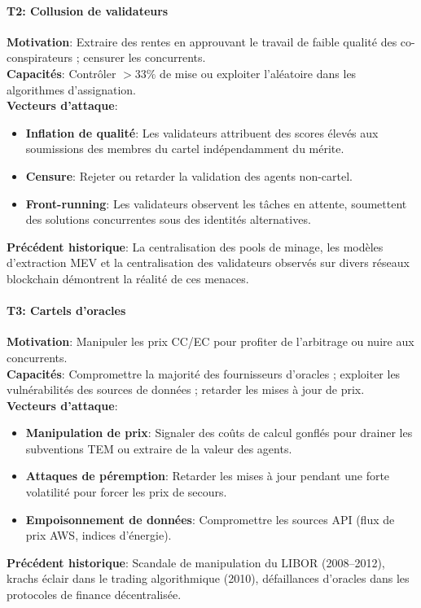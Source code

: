 \documentclass[11pt]{article}
\begin{document}
\paragraph{T2: Collusion de validateurs}
\textbf{Motivation}: Extraire des rentes en approuvant le travail de faible qualité des co-conspirateurs ; censurer les concurrents.\\
\textbf{Capacités}: Contrôler $>33\%$ de mise ou exploiter l'aléatoire dans les algorithmes d'assignation.\\
\textbf{Vecteurs d'attaque}:
\begin{itemize}[noitemsep]
  \item \textbf{Inflation de qualité}: Les validateurs attribuent des scores élevés aux soumissions des membres du cartel indépendamment du mérite.
  \item \textbf{Censure}: Rejeter ou retarder la validation des agents non-cartel.
  \item \textbf{Front-running}: Les validateurs observent les tâches en attente, soumettent des solutions concurrentes sous des identités alternatives.
\end{itemize}
\textbf{Précédent historique}: La centralisation des pools de minage, les modèles d'extraction MEV et la centralisation des validateurs observés sur divers réseaux blockchain démontrent la réalité de ces menaces.

\paragraph{T3: Cartels d'oracles}
\textbf{Motivation}: Manipuler les prix CC/EC pour profiter de l'arbitrage ou nuire aux concurrents.\\
\textbf{Capacités}: Compromettre la majorité des fournisseurs d'oracles ; exploiter les vulnérabilités des sources de données ; retarder les mises à jour de prix.\\
\textbf{Vecteurs d'attaque}:
\begin{itemize}[noitemsep]
  \item \textbf{Manipulation de prix}: Signaler des coûts de calcul gonflés pour drainer les subventions TEM ou extraire de la valeur des agents.
  \item \textbf{Attaques de péremption}: Retarder les mises à jour pendant une forte volatilité pour forcer les prix de secours.
  \item \textbf{Empoisonnement de données}: Compromettre les sources API (flux de prix AWS, indices d'énergie).
\end{itemize}
\textbf{Précédent historique}: Scandale de manipulation du LIBOR (2008--2012), krachs éclair dans le trading algorithmique (2010), défaillances d'oracles dans les protocoles de finance décentralisée.
\end{document}
